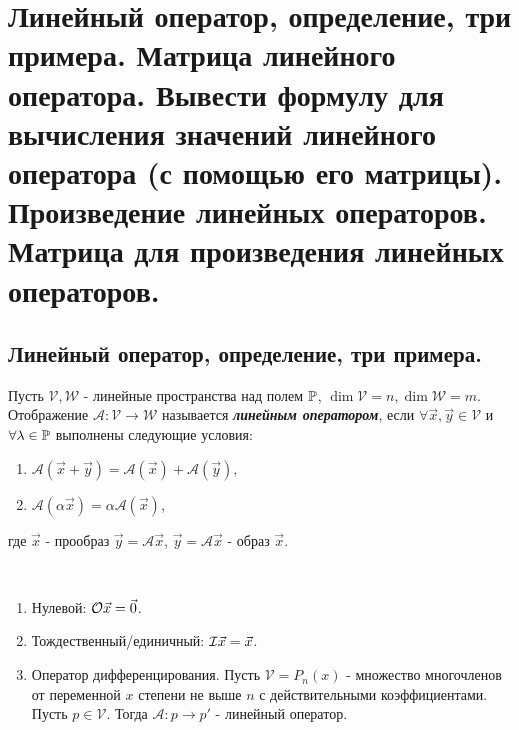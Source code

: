 \section{
    Линейный оператор, определение, три 
    примера. Матрица линейного оператора. 
    Вывести формулу для вычисления значений 
    линейного оператора (с помощью его 
    матрицы). Произведение линейных 
    операторов. Матрица для произведения 
    линейных операторов.
 }

 \subsection{
    Линейный оператор, определение, три 
    примера.
 }

\begin{definition}
    Пусть $\mathcal{V}, \mathcal{W}$ - 
    линейные пространства над полем $\mathbb{P}$, 
    $\dim \mathcal{V} = n, \dim \mathcal{W} = m$. 
    Отображение $\mathscr{A} \colon \mathcal{V} 
    \to \mathcal{W}$ называется 
    \textit{\textbf{линейным оператором}}, 
    если $\forall \vec{x}, \vec{y} \in 
    \mathcal{V}$ и $\forall \lambda \in \mathbb{P}$ 
    выполнены следующие условия:
    
    \begin{enumerate}[nosep]
        \item $\mathscr{A}(\vec{x} + \vec{y}) = 
        \mathscr{A}(\vec{x}) + \mathscr{A}(\vec{y}),$
        \item $\mathscr{A}(\alpha\vec{x}) = 
        \alpha\mathscr{A}(\vec{x})$,
    \end{enumerate}
    где $\vec{x}$ - прообраз $\vec{y} = \mathscr{A}\vec{x}$,
    $\vec{y} = \mathscr{A}\vec{x}$ - образ $\vec{x}$.
\end{definition}

\begin{example}~

    \begin{enumerate}[nosep]
        \item Нулевой: $\mathcal{O}\vec{x} = \vec{0}$.
        \item Тождественный/единичный: 
        $\mathcal{I}\vec{x} = \vec{x}$.
        \item Оператор дифференцирования. Пусть $\mathcal{V} = P_n(x)$ - множество многочленов от переменной $x$ степени не выше $n$ с действительными коэффициентами. Пусть $p \in \mathcal{V}$. Тогда $\mathscr{A} \colon p \to p'$ - линейный оператор.
    \end{enumerate}
\end{example}


